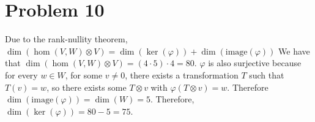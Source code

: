 \section*{Problem 10}
Due to the rank-nullity theorem,
$\dim(\hom(V,W) \otimes V) = \dim(\ker(\varphi)) + \dim(\text{image}(\varphi))$
We have that $\dim(\hom(V,W) \otimes V) = (4 \cdot 5) \cdot 4= 80$.
$\varphi$ is also surjective because for every $w \in W$,
for some $v \neq 0$,
there exists a transformation $T$ such that
$T(v) = w$, so there exists some $T \otimes v$ with
$\varphi(T \otimes v) = w$.
Therefore $\dim(\text{image}(\varphi)) = \dim(W) = 5$.
Therefore, $\dim(\ker(\varphi)) = 80 - 5 = 75$.
